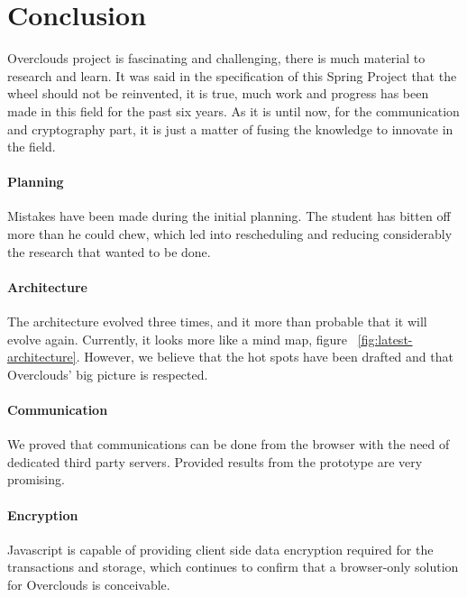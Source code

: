 
\section{Conclusion}
Overclouds project is fascinating and challenging, there is much material to research and learn. It was said in the specification of this Spring Project that the wheel should not be reinvented, it is true, much work and progress has been made in this field for the past six years. As it is until now, for the communication and cryptography part, it is just a matter of fusing the knowledge to innovate in the field.

\paragraph{Planning}
Mistakes have been made during the initial planning. The student has bitten off more than he could chew, which led into rescheduling and reducing considerably the research that wanted to be done.

\paragraph{Architecture}
The architecture evolved three times, and it more than probable that it will evolve again. Currently, it looks more like a mind map, figure ~\ref{fig:latest-architecture}. However, we believe that the hot spots have been drafted and that Overclouds' big picture is respected.

\paragraph{Communication}
We proved that communications can be done from the browser with the need of dedicated third party servers. Provided results from the prototype are very promising.

\paragraph{Encryption}
Javascript is capable of providing client side data encryption required for the transactions and storage, which continues to confirm that a browser-only solution for Overclouds is conceivable.

